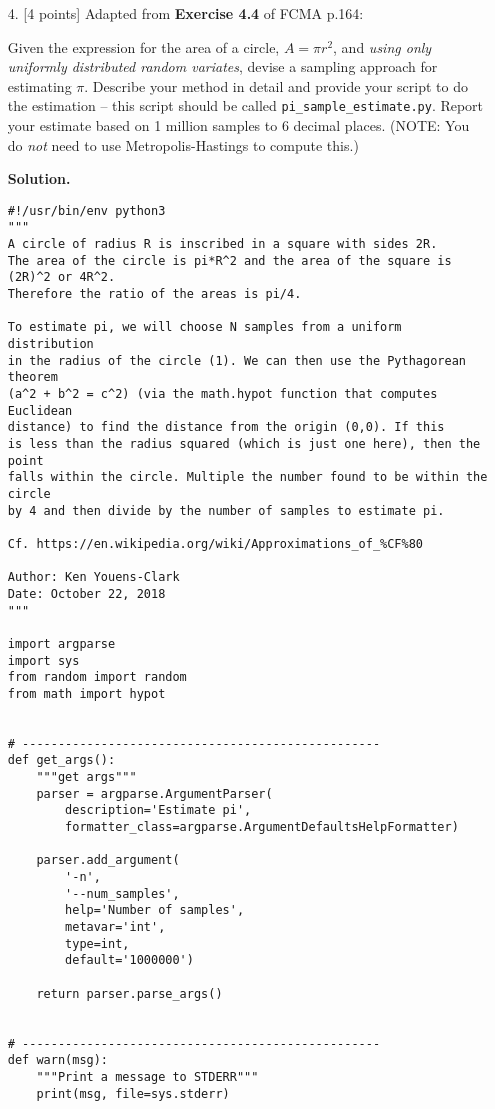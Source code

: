 \documentclass[10pt]{article}
\begin{document}
\begin{itemize}
{\bf Solution.}




\item[4.]  [4 points]
Adapted from {\bf Exercise 4.4} of FCMA p.164:

Given the expression for the area of a circle, $A = \pi r^2$, and {\em using only uniformly distributed random variates}, devise a sampling approach for estimating $\pi$.  Describe your method in detail and provide your script to do the estimation -- this script should be called {\tt pi\_sample\_estimate.py}.  Report your estimate based on 1 million samples to 6 decimal places.  (NOTE: You do {\em not} need to use Metropolis-Hastings to compute this.)

{\bf Solution.} %

\begin{verbatim}
#!/usr/bin/env python3
"""
A circle of radius R is inscribed in a square with sides 2R.
The area of the circle is pi*R^2 and the area of the square is (2R)^2 or 4R^2.
Therefore the ratio of the areas is pi/4.

To estimate pi, we will choose N samples from a uniform distribution
in the radius of the circle (1). We can then use the Pythagorean theorem
(a^2 + b^2 = c^2) (via the math.hypot function that computes Euclidean
distance) to find the distance from the origin (0,0). If this
is less than the radius squared (which is just one here), then the point
falls within the circle. Multiple the number found to be within the circle
by 4 and then divide by the number of samples to estimate pi.

Cf. https://en.wikipedia.org/wiki/Approximations_of_%CF%80

Author: Ken Youens-Clark
Date: October 22, 2018
"""

import argparse
import sys
from random import random
from math import hypot


# --------------------------------------------------
def get_args():
    """get args"""
    parser = argparse.ArgumentParser(
        description='Estimate pi',
        formatter_class=argparse.ArgumentDefaultsHelpFormatter)

    parser.add_argument(
        '-n',
        '--num_samples',
        help='Number of samples',
        metavar='int',
        type=int,
        default='1000000')

    return parser.parse_args()


# --------------------------------------------------
def warn(msg):
    """Print a message to STDERR"""
    print(msg, file=sys.stderr)



\end{verbatim}
\end{itemize}
\end{document}
